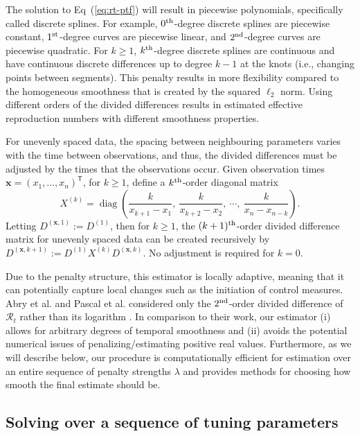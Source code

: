 \documentclass[10pt,letterpaper]{article}
\newcommand{\lr}[1]{\left(#1\right)}
\DeclareMathOperator*{\diag}{diag}
\def\bfx{\mathbf{x}}
\def\calR{\mathcal{R}}
\renewcommand{\top}{\mathsf{T}}
\def\th{^{\textnormal{th}}}
\def\first{$1^{\textnormal{st}}$}
\def\second{$2^{\textnormal{nd}}$}
\newcommand{\citep}[1]{\cite{#1}}
\renewcommand{\eqref}[1]{Eq~(\ref{#1})}
\begin{document}
The solution to \eqref{eq:rt-ptf} will result in piecewise
polynomials, specifically called discrete splines. For example, $0\th$-degree
discrete splines are piecewise constant, \first-degree curves are piecewise
linear, and \second-degree curves are piecewise quadratic. For $k\geq 1$,
$k\th$-degree discrete splines are continuous and have continuous discrete
differences up to degree $k-1$ at the knots (i.e., changing points between segments). This penalty results in more
flexibility compared to the homogeneous smoothness that is created by the
squared $\ell_2$ norm. Using different orders of the divided differences results in
estimated effective reproduction numbers with different smoothness properties. 



For unevenly spaced data, the spacing between neighbouring parameters
varies with the time between observations, and thus, the divided differences
must be adjusted by the times that the observations occur. Given observation
times $\bfx = {(x_1,\dots,x_n)}^\top$, for $k \geq 1$, define a $k\th$-order
diagonal matrix 
\begin{equation}
  X^{(k)} = \diag \lr{\frac{k}{x_{k+1} - x_1},\ \frac{k}{x_{k+2} - x_2},\ 
  \cdots,\ \frac{k}{x_n - x_{n-k}} }.
\end{equation}
Letting $D^{(\bfx,1)} := D^{(1)}$,
then for $k\geq 1$, the $(k+1)\th$-order divided difference matrix for unevenly
spaced data can be created recursively by
$D^{(\bfx, k+1)} := D^{(1)} X^{(k)} D^{(\bfx,k)}.$ No adjustment is required
for $k=0$. 


Due to the penalty structure, this estimator is locally adaptive,
meaning that it can potentially capture local changes such as the initiation of
control measures. Abry et al. and Pascal et al. considered only the
\second-order divided difference of $\calR_t$ rather than its logarithm 
\citep{abry2020spatial,pascal2022nonsmooth}. In
comparison to their work, our estimator (i) allows for arbitrary degrees of
temporal smoothness and (ii) avoids the potential numerical issues of
penalizing/estimating positive real values. Furthermore, as we will describe
below, our procedure is computationally efficient for estimation over an entire
sequence of penalty strengths $\lambda$ and provides methods for choosing how
smooth the final estimate should be.


\subsection{Solving over a sequence of tuning parameters}
\label{sec:candidate-set}
\end{document}
